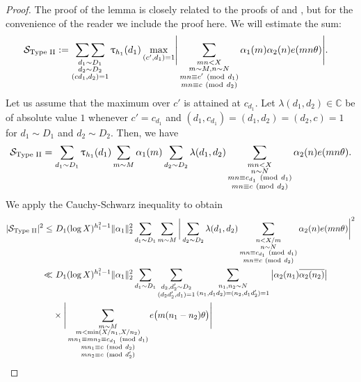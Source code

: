 \documentclass[12pt]{amsart}
\numberwithin{equation}{section}
\theoremstyle{remark}
\theoremstyle{definition}
\newcommand{\imod}[1]{\ (\mathrm{mod}\ #1)}
\begin{document}
\begin{proof}
The proof of the lemma is closely related to the proofs of \cite[Proposition 9]{Mat} and \cite[Theorem (p.~352)]{Mik}, but for the convenience of the reader we include the proof here.
We will estimate the sum:
\begin{align}\notag 
\mathcal{S}_{\text{Type II}}:=\mathop{\sum\sum}_{\substack{d_1\sim D_1\\d_2\sim D_2\\(cd_1,d_2)=1}}\uptau_{h_1}(d_1)\max_{(c', d_1)=1}&\Bigg\lvert\sum_{\substack{mn <X\\m\sim M, n\sim N\\mn\equiv c'\imod {d_1}\\mn\equiv c\imod {d_2}}}{\alpha}_1(m){\alpha}_2(n)e(mn\theta)\Bigg\rvert.
\end{align}
Let us assume that the maximum over $c'$ is attained at $c_{d_1}$. Let ${\lambda}(d_1, d_2)\in \mathbb{C}$ be of absolute value $1$  whenever $c'=c_{d_1}$ and $(d_1, c_{d_1})=(d_1, d_2)=(d_2, c)=1$  for $d_1\sim D_1$ and $d_2\sim D_2$. Then, we have
\begin{align}
\notag \mathcal{S}_{\text{Type II}}=\sum_{d_1\sim D_1}\uptau_{h_1}(d_1)\sum_{m\sim M}{\alpha}_1(m)\sum_{d_2\sim D_2}{\lambda}(d_1, d_2)\sum_{\substack{mn <X\\n\sim N\\mn\equiv c_{d_1}\imod {d_1}\\mn\equiv c\imod {d_2}}}{\alpha}_2(n)e(mn\theta).
\end{align}
We apply the Cauchy-Schwarz inequality to obtain
\begin{align}
\notag |\mathcal{S}_{\text{Type II}}|^2\leq &~D_1 (\log X)^{h_1^2-1}\|{\alpha}_1\|_2^2\sum_{\substack{d_1\sim D_1}}\sum_{\substack{m\sim M}}\bigg|\sum_{\substack{d_2\sim D_2}}{\lambda}(d_1,d_2)\sum_{\substack{n<X/m\\ n\sim N\\ mn\equiv c_{d_1} \imod {d_1}\\mn\equiv c\imod {d_2}}}{\alpha}_2(n)e(mn\theta)\bigg|^2\\
\notag \ll &~ D_1(\log X)^{h_1^2-1}\|{\alpha}_1\|_2^2\sum_{d_1\sim D_1}\sum_{\substack{d_2, d_2'\sim D_2\\(d_2d_2', d_1)=1}}\sum_{\substack{n_1, n_2\sim N\\(n_1, d_1d_2)=(n_2, d_1d_2')=1 }}\big|{\alpha}_2(n_1)\overline{{\alpha}_2(n_2)}\big|\\
\notag &\times \Bigg|\sum_{\substack{m\sim M\\m< \min (X/n_1, X/n_2)\\mn_1\equiv mn_2\equiv c_{d_1}\imod {d_1}\\mn_1\equiv c\imod {d_2}\\mn_2\equiv c\imod {d_2'}}}e\big(m(n_1-n_2)\theta\big)\Bigg|\\

\end{align}
\end{proof}
\end{document}

